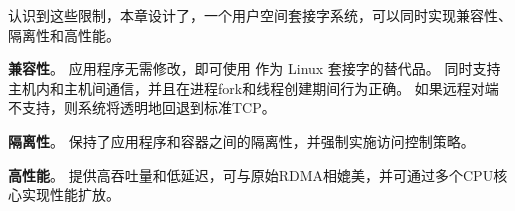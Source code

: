 



认识到这些限制，本章设计了\sys {}，一个用户空间套接字系统，可以同时实现兼容性、隔离性和高性能。
\begin{ecompact}
\item \textbf {兼容性}。
应用程序无需修改，即可使用\sys {} 作为 Linux 套接字的替代品。
\sys{} 同时支持主机内和主机间通信，并且在进程fork和线程创建期间行为正确。
如果远程对端不支持\sys {}，则系统将透明地回退到标准TCP。
\item \textbf {隔离性}。
\sys {}保持了应用程序和容器之间的隔离性，并强制实施访问控制策略。
\item \textbf {高性能}。
\sys {}提供高吞吐量和低延迟，可与原始RDMA相媲美，并可通过多个CPU核心实现性能扩放。
\end{ecompact}


